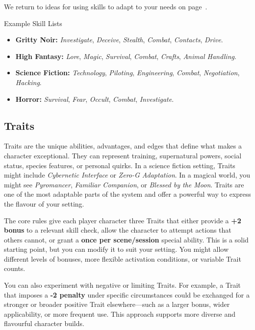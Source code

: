 We return to ideas for using skills to adapt \wyrd to your needs on page~\pageref{toolbox:sec:adapting-skills}.

\begin{CommentBox}{Example Skill Lists}
    \begin{itemize}
        \item \textbf{Gritty Noir:} \textit{Investigate}, \textit{Deceive}, \textit{Stealth}, \textit{Combat}, \textit{Contacts}, \textit{Drive}.
        \item \textbf{High Fantasy:} \textit{Lore}, \textit{Magic}, \textit{Survival}, \textit{Combat}, \textit{Crafts}, \textit{Animal Handling}.
        \item \textbf{Science Fiction:} \textit{Technology}, \textit{Piloting}, \textit{Engineering}, \textit{Combat}, \textit{Negotiation}, \textit{Hacking}.
        \item \textbf{Horror:} \textit{Survival}, \textit{Fear}, \textit{Occult}, \textit{Combat}, \textit{Investigate}.
    \end{itemize}
\end{CommentBox}

\subsection{Traits}

Traits are the unique abilities, advantages, and edges that define what makes a character exceptional. They can represent training, supernatural powers, social status, species features, or personal quirks. In a science fiction setting, Traits might include \textit{Cybernetic Interface} or \textit{Zero-G Adaptation}. In a magical world, you might see \textit{Pyromancer}, \textit{Familiar Companion}, or \textit{Blessed by the Moon}. Traits are one of the most adaptable parts of the system and offer a powerful way to express the flavour of your setting.

The core rules give each player character three Traits that either provide a \textbf{+2 bonus} to a relevant skill check, allow the character to attempt actions that others cannot, or grant a \textbf{once per scene/session} special ability. This is a solid starting point, but you can modify it to suit your setting. You might allow different levels of bonuses, more flexible activation conditions, or variable Trait counts.

You can also experiment with negative or limiting Traits. For example, a Trait that imposes a \textbf{-2 penalty} under specific circumstances could be exchanged for a stronger or broader positive Trait elsewhere—such as a larger bonus, wider applicability, or more frequent use. This approach supports more diverse and flavourful character builds.

